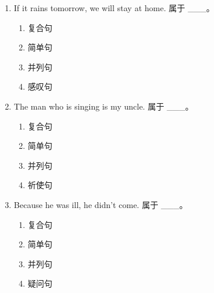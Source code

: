 \documentclass[11pt,a4paper]{ctexart}
\begin{document}
\begin{enumerate}[leftmargin=*,itemsep=4pt]
\begin{enumerate}[label=\Alph*.,leftmargin=2em,itemsep=1pt,topsep=2pt]
\item 并列句
\item 祈使句
\end{enumerate}
\item If it rains tomorrow, we will stay at home. 属于 \_\_\_。
\begin{enumerate}[label=\Alph*.,leftmargin=2em,itemsep=1pt,topsep=2pt]
\item 复合句
\item 简单句
\item 并列句
\item 感叹句
\end{enumerate}
\item The man who is singing is my uncle. 属于 \_\_\_。
\begin{enumerate}[label=\Alph*.,leftmargin=2em,itemsep=1pt,topsep=2pt]
\item 复合句
\item 简单句
\item 并列句
\item 祈使句
\end{enumerate}
\item Because he was ill, he didn’t come. 属于 \_\_\_。
\begin{enumerate}[label=\Alph*.,leftmargin=2em,itemsep=1pt,topsep=2pt]
\item 复合句
\item 简单句
\item 并列句
\item 疑问句
\end{enumerate}
\end{enumerate}
\end{document}
